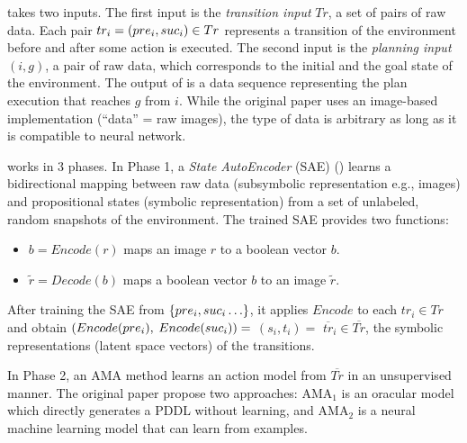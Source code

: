 \latentplanner takes two inputs.
The first input is the \emph{transition input} $Tr$, a set of pairs of raw data.
Each pair $tr_i=(pre_i, suc_i) \in Tr$ represents a transition of the environment before and after some action is executed.
The second input is the \emph{planning input} $(i, g)$, a pair of raw data, which corresponds to the initial and the goal state of the environment.
The output of \latentplanner is a data sequence representing the plan execution that reaches $g$ from $i$.
While the original paper uses an image-based implementation (``data'' = raw images),
the type of data is arbitrary as long as it is compatible to neural network.


\latentplanner works in 3 phases.
In Phase 1, a \emph{State AutoEncoder} (SAE) () learns a bidirectional mapping between raw data (subsymbolic representation e.g., images)
 and propositional states (symbolic representation) from a set of unlabeled, random snapshots of the environment.
The trained SAE provides two functions:
\begin{itemize} %
\setlength{\itemsep}{-0.3em}
\item $b=Encode(r)$ maps an image  $r$ to a boolean vector $b$.
\item $\tilde{r}=Decode(b)$ maps a boolean vector $b$ to an image $\tilde{r}$.
\end{itemize}
After training the SAE from ${\left\{pre_i, suc_i\ldots\right\}}$,
it applies $Encode$ to each $tr_i \in Tr$ and obtain $(Encode(pre_i),$ $Encode(suc_i))=$ $(s_i,t_i)=$ $\overline{tr}_i\in \overline{Tr}$,
the symbolic representations (latent space vectors) of the transitions.

In Phase 2, an AMA method learns an action model from $\overline{Tr}$ in an unsupervised manner.
The original paper propose two approaches: AMA$_1$ is an oracular model which directly generates a PDDL without learning,
and AMA$_2$ is a neural machine learning model that can learn from examples.

